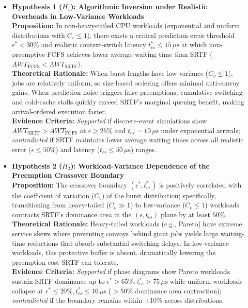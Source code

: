 \documentclass[11pt]{article}
\newcommand{\qLabel}[1]{
    {\fontsize{10.2}{12.2}\selectfont \textbf{#1}}
}
\begin{document}
\begin{itemize}[leftmargin=1.2em, itemsep=0.35em, parsep=0pt]

    \item \qLabel{Hypothesis 1 ($H_1$): Algorithmic Inversion under Realistic Overheads in Low-Variance Workloads} \\
    \textbf{Proposition:} In non-heavy-tailed CPU workloads (exponential and uniform distributions with $C_v \le 1$), there exists a critical prediction error threshold $\epsilon^* < 30\%$ and realistic context-switch latency $t_{cs}^* \le 15\,\mu\text{s}$ at which non-preemptive FCFS achieves lower average waiting time than SRTF ($AWT_{\text{FCFS}} < AWT_{\text{SRTF}}$). \\
    \textbf{Theoretical Rationale:} When burst lengths have low variance ($C_v \le 1$), jobs are relatively uniform, so size-based ordering offers minimal anti-convoy gains. When prediction noise triggers false preemptions, cumulative switching and cold-cache stalls quickly exceed SRTF's marginal queuing benefit, making arrival-ordered execution faster. \\
    \textbf{Evidence Criteria:} \textit{Supported} if discrete-event simulations show $AWT_{\text{SRTF}} > AWT_{\text{FCFS}}$ at $\epsilon \ge 25\%$ and $t_{cs} = 10\,\mu\text{s}$ under exponential arrivals; \textit{contradicted} if SRTF maintains lower average waiting times across all realistic error ($\epsilon \le 50\%$) and latency ($t_{cs} \le 50\,\mu\text{s}$) ranges.

    \item \qLabel{Hypothesis 2 ($H_2$): Workload-Variance Dependence of the Preemption Crossover Boundary} \\
    \textbf{Proposition:} The crossover boundary $(\epsilon^*, t_{cs}^*)$ is positively correlated with the coefficient of variation ($C_v$) of the burst distribution; specifically, transitioning from heavy-tailed ($C_v \gg 1$) to low-variance ($C_v \le 1$) workloads contracts SRTF's dominance area in the $(\epsilon, t_{cs})$ plane by at least $50\%$. \\
    \textbf{Theoretical Rationale:} Heavy-tailed workloads (e.g., Pareto) have extreme service skews where preventing convoys behind giant jobs yields large waiting-time reductions that absorb substantial switching delays. In low-variance workloads, this protective buffer is absent, dramatically lowering the preemption cost SRTF can tolerate. \\
    \textbf{Evidence Criteria:} \textit{Supported} if phase diagrams show Pareto workloads sustain SRTF dominance up to $\epsilon^* > 65\%, t_{cs}^* > 75\,\mu\text{s}$ while uniform workloads collapse at $\epsilon^* \le 20\%, t_{cs}^* \le 10\,\mu\text{s}$ ($>50\%$ dominance area contraction); \textit{contradicted} if the boundary remains within $\pm 10\%$ across distributions.

\end{itemize}
\end{document}
